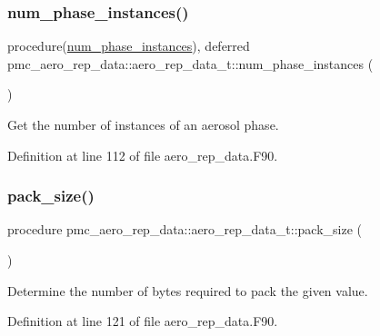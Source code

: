 \subsubsection{\texorpdfstring{num\+\_\+phase\+\_\+instances()}{num\_phase\_instances()}}
{\footnotesize\ttfamily procedure(\mbox{\hyperlink{interfacepmc__aero__rep__data_1_1num__phase__instances}{num\+\_\+phase\+\_\+instances}}), deferred pmc\+\_\+aero\+\_\+rep\+\_\+data\+::aero\+\_\+rep\+\_\+data\+\_\+t\+::num\+\_\+phase\+\_\+instances (\begin{DoxyParamCaption}{ }\end{DoxyParamCaption})\hspace{0.3cm}{\ttfamily [private]}}



Get the number of instances of an aerosol phase. 



Definition at line 112 of file aero\+\_\+rep\+\_\+data.\+F90.

\mbox{\label{structpmc__aero__rep__data_1_1aero__rep__data__t_a591098eb090789401ae5bcd8e5fa288f}} 
\subsubsection{\texorpdfstring{pack\+\_\+size()}{pack\_size()}}
{\footnotesize\ttfamily procedure pmc\+\_\+aero\+\_\+rep\+\_\+data\+::aero\+\_\+rep\+\_\+data\+\_\+t\+::pack\+\_\+size (\begin{DoxyParamCaption}{ }\end{DoxyParamCaption})\hspace{0.3cm}{\ttfamily [private]}}



Determine the number of bytes required to pack the given value. 



Definition at line 121 of file aero\+\_\+rep\+\_\+data.\+F90.

\mbox{\label{structpmc__aero__rep__data_1_1aero__rep__data__t_ae8ea3228c47870eb42a519106bcd5fa1}} 
